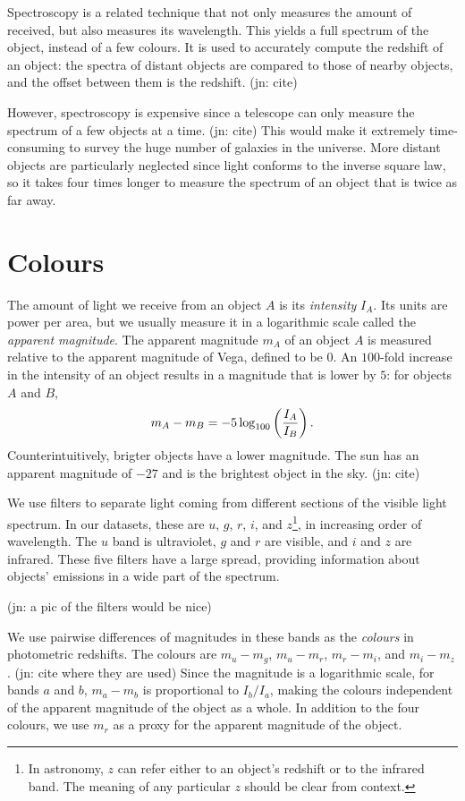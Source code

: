 \documentclass[11pt,twoside,openright]{report}
\newcommand\jn[1]{{\color{red}(jn: #1)}}
\begin{document}
  Spectroscopy is a related technique that not only measures the amount of received, but also measures its wavelength. This yields a full spectrum of the object, instead of a few colours. It is used to accurately compute the redshift of an object: the spectra of distant objects are compared to those of nearby objects, and the offset between them is the redshift. \jn{cite}

  However, spectroscopy is expensive since a telescope can only measure the spectrum of a few objects at a time. \jn{cite} This would make it extremely time-consuming to survey the huge number of galaxies in the universe. More distant objects are particularly neglected since light conforms to the inverse square law, so it takes four times longer to measure the spectrum of an object that is twice as far away.

  \section{Colours}

  The amount of light we receive from an object $A$ is its \emph{intensity} $I_A$. Its units are power per area, but we usually measure it in a logarithmic scale called the \emph{apparent magnitude}. The apparent magnitude $m_A$ of an object $A$ is measured relative to the apparent magnitude of Vega, defined to be $0$. An $100$-fold increase in the intensity of an object results in a magnitude that is lower by $5$: for objects $A$ and $B$,\[
    m_A - m_B = -5 \log_{100} \left( \frac{I_A}{I_B} \right) \text.
  \] Counterintuitively, brigter objects have a lower magnitude. The sun has an apparent magnitude of $-27$ and is the brightest object in the sky. \jn{cite}

  We use filters to separate light coming from different sections of the visible light spectrum. In our datasets, these are $u$, $g$, $r$, $i$, and $z$\footnote{In astronomy, $z$ can refer either to an object's redshift or to the infrared band. The meaning of any particular $z$ should be clear from context.}, in increasing order of wavelength. The $u$ band is ultraviolet, $g$ and $r$ are visible, and $i$ and $z$ are infrared. These five filters have a large spread, providing information about objects' emissions in a wide part of the spectrum.

  \jn{a pic of the filters would be nice}

  We use pairwise differences of magnitudes in these bands as the \emph{colours} in photometric redshifts. The colours are $m_u - m_g$, $m_u - m_r$, $m_r - m_i$, and $m_i - m_z$. \jn{cite where they are used} Since the magnitude is a logarithmic scale, for bands $a$ and $b$, $m_a - m_b$ is proportional to $I_b / I_a$, making the colours independent of the apparent magnitude of the object as a whole. In addition to the four colours, we use $m_r$ as a proxy for the apparent magnitude of the object.
\end{document}
